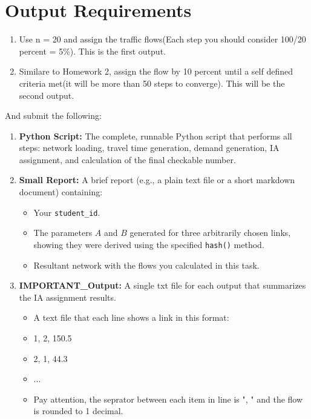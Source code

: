 \documentclass{rapportCS} %
\begin{document}
\section{Output Requirements}

\begin{enumerate}
    \item Use n = 20 and assign the traffic flows(Each step you should consider 100/20 percent = 5\%). This is the first output.
    \item Similare to Homework 2, assign the flow by 10 percent until a self defined criteria met(it will be more than 50 steps to converge). This will be the second output.
\end{enumerate}

And submit the following:

\begin{enumerate}
    \item \textbf{Python Script:} The complete, runnable Python script that performs all steps: network loading, travel time generation, demand generation, IA assignment, and calculation of the final checkable number.
    \item \textbf{Small Report:} A brief report (e.g., a plain text file or a short markdown document) containing:
    \begin{itemize}
        \item Your \texttt{student\_id}.
        \item The parameters \( A \) and \( B \) generated for three arbitrarily chosen links, showing they were derived using the specified \texttt{hash()} method.
        \item Resultant network with the flows you calculated in this task.
    \end{itemize}
    \item \textbf{IMPORTANT\_Output:} A single txt file for each output that summarizes the IA assignment results.
        \begin{itemize}
            \item A text file that each line shows a link in this format: 
            \item[] 1, 2, 150.5
            \item[] 2, 1, 44.3
            \item[] ...
            \item Pay attention, the seprator between each item in line is ", " and the flow is rounded to 1 decimal.
        \end{itemize}
\end{enumerate}
    
%
% 
\end{document}
